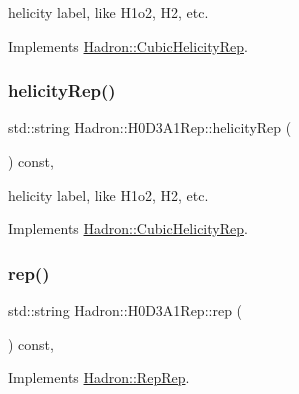 helicity label, like H1o2, H2, etc. 

Implements \mbox{\hyperlink{structHadron_1_1CubicHelicityRep_af1096946b7470edf0a55451cc662f231}{Hadron\+::\+Cubic\+Helicity\+Rep}}.

\mbox{\label{structHadron_1_1H0D3A1Rep_a6a15df8ab6ee2e04b693258ef6cd02ef}} 
\subsubsection{\texorpdfstring{helicityRep()}{helicityRep()}\hspace{0.1cm}{\footnotesize\ttfamily [3/3]}}
{\footnotesize\ttfamily std\+::string Hadron\+::\+H0\+D3\+A1\+Rep\+::helicity\+Rep (\begin{DoxyParamCaption}{ }\end{DoxyParamCaption}) const\hspace{0.3cm}{\ttfamily [inline]}, {\ttfamily [virtual]}}

helicity label, like H1o2, H2, etc. 

Implements \mbox{\hyperlink{structHadron_1_1CubicHelicityRep_af1096946b7470edf0a55451cc662f231}{Hadron\+::\+Cubic\+Helicity\+Rep}}.

\mbox{\label{structHadron_1_1H0D3A1Rep_a5dae40cb41876bf42a5c9f65ffd5f222}} 
\subsubsection{\texorpdfstring{rep()}{rep()}\hspace{0.1cm}{\footnotesize\ttfamily [1/5]}}
{\footnotesize\ttfamily std\+::string Hadron\+::\+H0\+D3\+A1\+Rep\+::rep (\begin{DoxyParamCaption}{ }\end{DoxyParamCaption}) const\hspace{0.3cm}{\ttfamily [inline]}, {\ttfamily [virtual]}}



Implements \mbox{\hyperlink{structHadron_1_1RepRep_ab3213025f6de249f7095892109575fde}{Hadron\+::\+Rep\+Rep}}.

\mbox{\label{structHadron_1_1H0D3A1Rep_a5dae40cb41876bf42a5c9f65ffd5f222}} 
